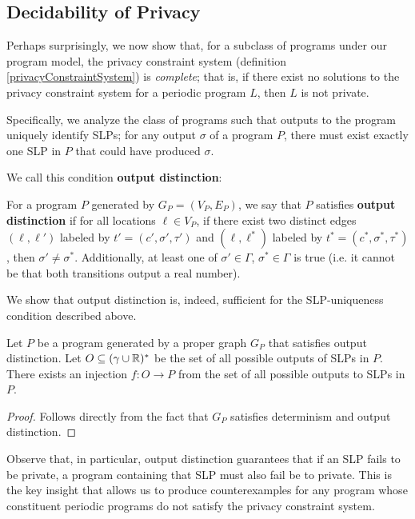 \subsection{Decidability of Privacy}

Perhaps surprisingly, we now show that, for a subclass of programs under our program model, the privacy constraint system (definition \ref{privacyConstraintSystem}) is \textit{complete}; that is, if there exist no solutions to the privacy constraint system for a periodic program $L$, then $L$ is not private. 

Specifically, we analyze the class of programs such that outputs to the program uniquely identify SLPs; for any output $\sigma$ of a program $P$, there must exist exactly one SLP in $P$ that could have produced $\sigma$. 

We call this condition \textbf{output distinction}:

\begin{defn}\label{outputDistinctionDef}
    For a program $P$ generated by $G_P = (V_P, E_P)$, we say that $P$ satisfies \textbf{output distinction} if for all locations $\ell\in V_P$, if there exist two distinct edges $(\ell, \ell')$ labeled by $t'=(c', \sigma', \tau')$ and $(\ell, \ell^*)$ labeled by $t^* = (c^*, \sigma^*, \tau^*)$, then $\sigma' \neq \sigma^*$. Additionally, at least one of $\sigma'\in \Gamma$, $\sigma^*\in \Gamma$ is true (i.e. it cannot be that both transitions output a real number).
\end{defn}

We show that output distinction is, indeed, sufficient for the SLP-uniqueness condition described above.

\begin{prop}
    Let $P$ be a program generated by a proper graph $G_P$ that satisfies output distinction. Let $O\subseteq (\gamma\cup \mathbb{R})^*$ be the set of all possible outputs of SLPs in $P$. There exists an injection $f: O\to P$ from the set of all possible outputs to SLPs in $P$. 
\end{prop}
\begin{proof}
    Follows directly from the fact that $G_P$ satisfies determinism and output distinction. 
\end{proof}

Observe that, in particular, output distinction guarantees that if an SLP fails to be private, a program containing that SLP must also fail be to private. This is the key insight that allows us to produce counterexamples for any program whose constituent periodic programs do not satisfy the privacy constraint system. 

